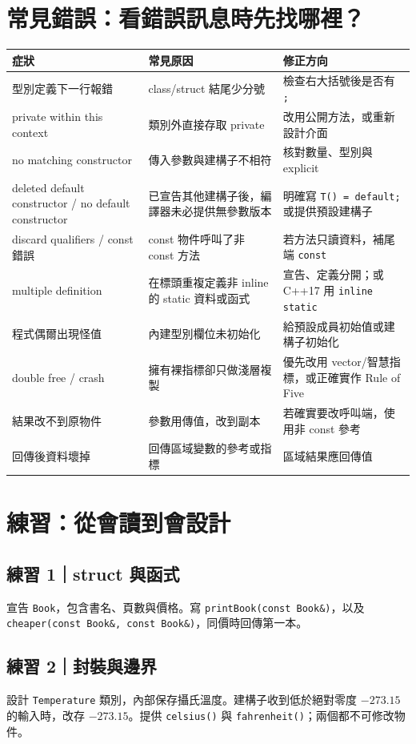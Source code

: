 \documentclass[11pt,a4paper]{article}
\newcommand{\code}[1]{\texttt{#1}}
\begin{document}
\section{常見錯誤：看錯誤訊息時先找哪裡？}

\begin{longtable}{p{45mm}p{48mm}p{50mm}}
\toprule
症狀 & 常見原因 & 修正方向 \\
\midrule
\endhead
型別定義下一行報錯 & class/struct 結尾少分號 & 檢查右大括號後是否有 \code{;} \\
private within this context & 類別外直接存取 private & 改用公開方法，或重新設計介面 \\
no matching constructor & 傳入參數與建構子不相符 & 核對數量、型別與 explicit \\
deleted default constructor / no default constructor & 已宣告其他建構子後，編譯器未必提供無參數版本 & 明確寫 \code{T() = default;} 或提供預設建構子 \\
discard qualifiers / const 錯誤 & const 物件呼叫了非 const 方法 & 若方法只讀資料，補尾端 \code{const} \\
multiple definition & 在標頭重複定義非 inline 的 static 資料或函式 & 宣告、定義分開；或 C++17 用 \code{inline static} \\
程式偶爾出現怪值 & 內建型別欄位未初始化 & 給預設成員初始值或建構子初始化 \\
double free / crash & 擁有裸指標卻只做淺層複製 & 優先改用 vector/智慧指標，或正確實作 Rule of Five \\
結果改不到原物件 & 參數用傳值，改到副本 & 若確實要改呼叫端，使用非 const 參考 \\
回傳後資料壞掉 & 回傳區域變數的參考或指標 & 區域結果應回傳值 \\
\bottomrule
\end{longtable}

\section{練習：從會讀到會設計}

\subsection*{練習 1｜struct 與函式}
宣告 \code{Book}，包含書名、頁數與價格。寫 \code{printBook(const Book\&)}，以及 \code{cheaper(const Book\&, const Book\&)}，同價時回傳第一本。

\subsection*{練習 2｜封裝與邊界}
設計 \code{Temperature} 類別，內部保存攝氏溫度。建構子收到低於絕對零度 $-273.15$ 的輸入時，改存 $-273.15$。提供 \code{celsius()} 與 \code{fahrenheit()}；兩個都不可修改物件。
\end{document}
